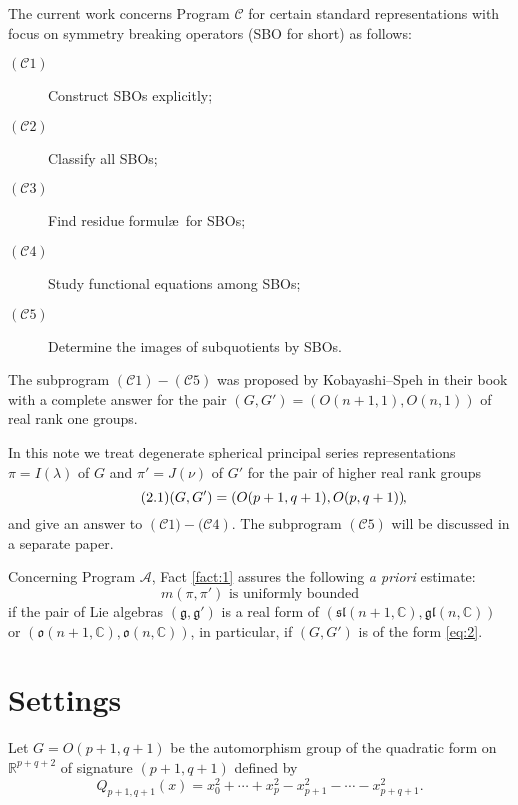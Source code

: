 \documentclass[reqno,12pt]{pja00} %
\providecommand{\C}{\mathbb{C}}
\newcommand{\R}{\mathbb{R}}
\theoremstyle{plain}
\theoremstyle{definition}
\theoremstyle{exampstyle} \newtheorem{examp}[theorem]{Theorem}
\begin{document}
The current work concerns Program ${\mathcal{C}}$ for certain standard
representations with focus on symmetry breaking operators (SBO for short) as follows:
\begin{description}
  \item[$(\mathcal{C}1)$] Construct SBOs explicitly;
  \item[$(\mathcal{C}2)$] Classify all SBOs;
  \item[$(\mathcal{C}3)$] Find residue formul\ae\, for SBOs;
  \item[$(\mathcal{C}4)$] Study functional equations among SBOs;
  \item[$(\mathcal{C}5)$] Determine the images of subquotients by SBOs.
\end{description}
The subprogram $(\mathcal{C}1) - (\mathcal{C}5)$ was proposed by
Kobayashi--Speh in their book {\cite{kobayashi2015symmetry}} with
a complete answer %
for the
pair $(G, G') = (O (n + 1, 1), O (n, 1))$ of real rank one groups.


In this note we treat degenerate spherical principal series representations $\pi=I(\lambda)$ of $G$ and $\pi'=J(\nu)$ of $G'$ for the pair
of higher real rank groups\begin{equation}\tag{2.1}\label{eq:2}
	(G,G')=\left( O(p+1,q+1),O(p,q+1) \right)\kern-0.1cm,
\end{equation}
and give an answer to $\left( \mathcal{C}1)-(\mathcal{C}4 \right)$. The subprogram $\left( \mathcal{C}5 \right)$ will be discussed
in a separate paper.

Concerning Program $\mathcal{A}$,  Fact \ref{fact:1} assures the following {\it a priori} estimate:\begin{equation*}
	m(\pi,\pi')\mbox{ is uniformly bounded}
\end{equation*}
if the pair of Lie algebras $(\mathfrak{g},\mathfrak{g}')$ is a real form of $(\mathfrak{sl}(n+1,\C),\mathfrak{gl}(n,\C))$
or $(\mathfrak{o}(n+1,\C),\mathfrak{o}(n,\C))$, in particular, if $(G,G')$ is of the form \eqref{eq:2}.
\section{Settings}
Let $G=O(p+1,q+1)$ be the automorphism group of the quadratic form
on $\R^{p+q+2}$ of signature $(p+1,q+1)$ defined by
\begin{equation*}
	Q_{p+1,q+1}(x)
		=x_0^2+\cdots+x_{p}^2-x_{p+1}^2-\cdots-x_{p+q+1}^2.
\end{equation*}
\end{document}
